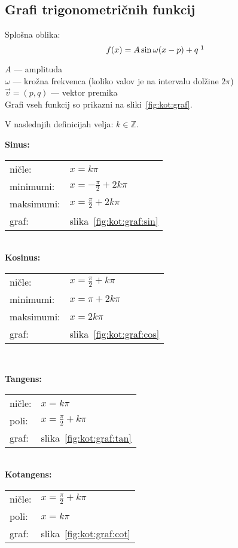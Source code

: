 \documentclass[a4paper,oneside,12pt,fleqn]{article}
\def\Z{\ensuremath{\mathbb Z}}
\numberwithin{equation}{section}
\begin{document}
\subsection{Grafi trigonometričnih funkcij}
\label{sec:kot:graf}
Splošna oblika:
\[ f(x) = A\sin\omega(x-p)+q \; \footnotemark \]

$A$ --- amplituda \\
$\omega$ --- krožna frekvenca (koliko valov je na intervalu dolžine $2\pi$) \\
$\vec{v} = (p,q)$ --- vektor premika \\
Grafi vseh funkcij so prikazni na sliki~\ref{fig:kot:graf}.

V naslednjih definicijah velja: $k \in \Z$.

\parbox[t]{0.5\textwidth}{
\textbf{Sinus:} \\[6pt]
\begin{tabular}[h!]{ll}
  ničle:    & $x = k\pi$ \\
  minimumi: & $x = -\frac{\pi}{2} + 2k\pi$ \\
  maksimumi:& $x = \frac{\pi}{2} + 2k\pi$ \\  
  graf:     & slika~\ref{fig:kot:graf:sin}
\end{tabular} \\[12pt]
\textbf{Kosinus:}\\[6pt]
\begin{tabular}[h!]{ll}
  ničle:    & $x = \frac{\pi}{2} + k\pi$ \\
  minimumi: & $x = \pi + 2k\pi$ \\
  maksimumi:& $x = 2k\pi$ \\ 
  graf:     & slika~\ref{fig:kot:graf:cos}
\end{tabular} \\[12pt]
}
\parbox[t]{0.5\textwidth}{
\textbf{Tangens:} \\[6pt]
\begin{tabular}[h!]{ll}
  ničle: & $x = k\pi$ \\
  poli:  & $x = \frac{\pi}{2} + k\pi$ \\
  graf:     & slika~\ref{fig:kot:graf:tan}
\end{tabular} \\[24pt]
\textbf{Kotangens:} \\[6pt]
\begin{tabular}[h!]{ll}
  ničle:  & $x = \frac{\pi}{2} + k\pi$ \\
  poli: & $x = k\pi$ \\
  graf:     & slika~\ref{fig:kot:graf:cot}
\end{tabular} \\[12pt]
}
\end{document}
